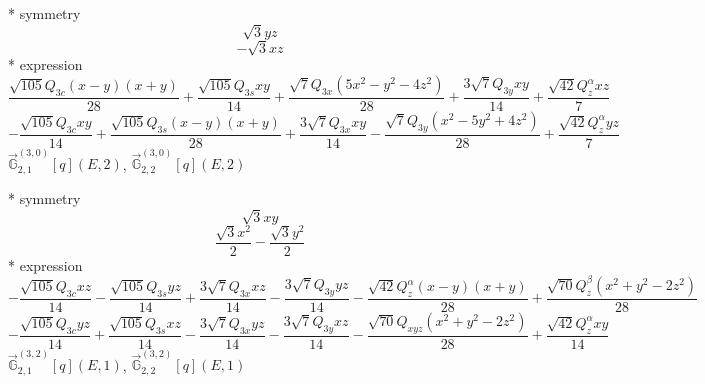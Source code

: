 \documentclass[fleqn,8pt]{jsarticle}
\begin{document}
\noindent\quad ** symmetry
\begin{dmath*}
\sqrt{3} y z
\end{dmath*}
\begin{dmath*}
- \sqrt{3} x z
\end{dmath*}
\noindent\quad ** expression
\begin{dmath*}
\frac{\sqrt{105} Q_{3c} \left(x - y\right) \left(x + y\right)}{28} + \frac{\sqrt{105} Q_{3s} x y}{14} + \frac{\sqrt{7} Q_{3x} \left(5 x^{2} - y^{2} - 4 z^{2}\right)}{28} + \frac{3 \sqrt{7} Q_{3y} x y}{14} + \frac{\sqrt{42} Q_{z}^{\alpha} x z}{7}
\end{dmath*}
\begin{dmath*}
- \frac{\sqrt{105} Q_{3c} x y}{14} + \frac{\sqrt{105} Q_{3s} \left(x - y\right) \left(x + y\right)}{28} + \frac{3 \sqrt{7} Q_{3x} x y}{14} - \frac{\sqrt{7} Q_{3y} \left(x^{2} - 5 y^{2} + 4 z^{2}\right)}{28} + \frac{\sqrt{42} Q_{z}^{\alpha} y z}{7}
\end{dmath*}
\noindent\quad $\vec{\mathbb{G}}_{2,1}^{(3,0)}[q](E,2)$, $\vec{\mathbb{G}}_{2,2}^{(3,0)}[q](E,2)$

\noindent\quad ** symmetry
\begin{dmath*}
\sqrt{3} x y
\end{dmath*}
\begin{dmath*}
\frac{\sqrt{3} x^{2}}{2} - \frac{\sqrt{3} y^{2}}{2}
\end{dmath*}
\noindent\quad ** expression
\begin{dmath*}
- \frac{\sqrt{105} Q_{3c} x z}{14} - \frac{\sqrt{105} Q_{3s} y z}{14} + \frac{3 \sqrt{7} Q_{3x} x z}{14} - \frac{3 \sqrt{7} Q_{3y} y z}{14} - \frac{\sqrt{42} Q_{z}^{\alpha} \left(x - y\right) \left(x + y\right)}{28} + \frac{\sqrt{70} Q_{z}^{\beta} \left(x^{2} + y^{2} - 2 z^{2}\right)}{28}
\end{dmath*}
\begin{dmath*}
- \frac{\sqrt{105} Q_{3c} y z}{14} + \frac{\sqrt{105} Q_{3s} x z}{14} - \frac{3 \sqrt{7} Q_{3x} y z}{14} - \frac{3 \sqrt{7} Q_{3y} x z}{14} - \frac{\sqrt{70} Q_{xyz} \left(x^{2} + y^{2} - 2 z^{2}\right)}{28} + \frac{\sqrt{42} Q_{z}^{\alpha} x y}{14}
\end{dmath*}
\noindent\quad $\vec{\mathbb{G}}_{2,1}^{(3,2)}[q](E,1)$, $\vec{\mathbb{G}}_{2,2}^{(3,2)}[q](E,1)$
\end{document}
